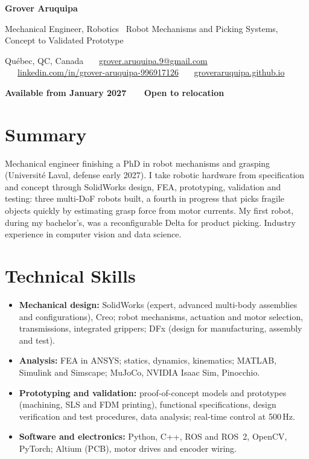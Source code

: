 \documentclass[10pt,letterpaper]{article}
\begin{document}
{\LARGE\bfseries Grover Aruquipa}\par\vspace{2pt}
{\large Mechanical Engineer, Robotics \textbar\ Robot Mechanisms and Picking Systems, Concept to Validated Prototype}\par\vspace{3pt}
{\small Qu\'ebec, QC, Canada \ \textbullet\ \
\href{mailto:grover.aruquipa.9@gmail.com}{grover.aruquipa.9@gmail.com} \ \textbullet\ \
\href{https://www.linkedin.com/in/grover-aruquipa-996917126}{linkedin.com/in/grover-aruquipa-996917126} \ \textbullet\ \
\href{https://groveraruquipa.github.io}{groveraruquipa.github.io}}\par\vspace{1pt}
{\small\bfseries Available from January 2027 \ \textbullet\ \ Open to relocation}\par


\section{Summary}
Mechanical engineer finishing a PhD in robot mechanisms and grasping (Universit\'e Laval, defense early 2027). I take
robotic hardware from specification and concept through SolidWorks design, FEA, prototyping, validation and testing:
three multi-DoF robots built, a fourth in progress that picks fragile objects quickly by estimating grasp force from
motor currents. My first robot, during my bachelor's, was a reconfigurable Delta for product picking. Industry
experience in computer vision and data science.

\section{Technical Skills}
\begin{itemize}
\item \textbf{Mechanical design:} SolidWorks (expert, advanced multi-body assemblies and configurations), Creo; robot
mechanisms, actuation and motor selection, transmissions, integrated grippers; DFx (design for manufacturing, assembly
and test).
\item \textbf{Analysis:} FEA in ANSYS; statics, dynamics, kinematics; MATLAB, Simulink and Simscape; MuJoCo, NVIDIA Isaac
Sim, Pinocchio.
\item \textbf{Prototyping and validation:} proof-of-concept models and prototypes (machining, SLS and FDM printing),
functional specifications, design verification and test procedures, data analysis; real-time control at 500\,Hz.
\item \textbf{Software and electronics:} Python, C++, ROS and ROS~2, OpenCV, PyTorch; Altium (PCB), motor drives and
encoder wiring.
\end{itemize}
\end{document}
